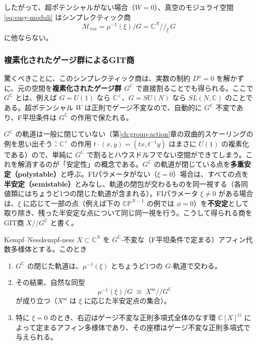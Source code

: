 \documentclass[uplatex, dvipdfmx, book]{jsbook}
\let\origsubsubsection\subsubsection
\renewcommand{\subsection}{\origsubsubsection}
\renewcommand{\subsubsection}{\paragraph}
\begin{document}
したがって、超ポテンシャルがない場合（$W = 0$）、真空のモジュライ空間 \eqref{eq:susy-moduli} はシンプレクティック商
\begin{equation}
    \mathcal{M}_{\text{vac}} = \mu^{-1}(\xi) / G = \mathbb{C}^N /\!/_{\xi}\, G
\end{equation}
に他ならない。

\subsection{複素化されたゲージ群によるGIT商}

驚くべきことに、このシンプレクティック商は、実数の制約 $D^a = 0$ を解かずに、元の空間を\textbf{複素化されたゲージ群 $G^\mathbb{C}$} で直接割ることでも得られる。ここで $G^\mathbb{C}$ とは、例えば $G = U(1)$ なら $\mathbb{C}^\times$、$G = SU(N)$ なら $SL(N, \mathbb{C})$ のことである。超ポテンシャル $W$ は正則でゲージ不変なので、自動的に $G^\mathbb{C}$ 不変であり、F平坦条件は $G^\mathbb{C}$ の作用で保たれる。

$G^\mathbb{C}$ の軌道は一般に閉じていない（第\ref{ch:group-action}章の双曲的スケーリングの例を思い出そう：$\mathbb{C}^\times$ の作用 $t\cdot(x, y) = (tx, t^{-1}y)$ はまさに $U(1)$ の複素化である）ので、単純に $G^\mathbb{C}$ で割るとハウスドルフでない空間ができてしまう。これを解消するのが「安定性」の概念である。$G^\mathbb{C}$ の軌道が閉じている点を\textbf{多重安定（polystable）}と呼ぶ。FIパラメータがない（$\xi = 0$）場合は、すべての点を\textbf{半安定（semistable）}とみなし、軌道の閉包が交わるものを同一視する（各同値類にはちょうど1つの閉じた軌道が含まれる）。FIパラメータ $\xi \neq 0$ がある場合は、$\xi$ に応じて一部の点（例えば下の $\mathbb{CP}^{N-1}$ の例では $\phi = 0$）を\textbf{不安定}として取り除き、残った半安定な点について同じ同一視を行う。こうして得られる商をGIT商 $X /\!/ G^\mathbb{C}$ と書く。

\begin{mythm}{Kempf--Ness}{kempf-ness}
$X \subset \mathbb{C}^N$ を $G^\mathbb{C}$-不変な（F平坦条件で定まる）アフィン代数多様体とする。このとき
\begin{enumerate}
    \item $G^\mathbb{C}$ の閉じた軌道は、$\mu^{-1}(\xi)$ とちょうど1つの $G$-軌道で交わる。
    \item その結果、自然な同型
    \begin{equation*}
        \mu^{-1}(\xi) / G \;\cong\; X^{\text{ss}} /\!/ G^\mathbb{C}
    \end{equation*}
    が成り立つ（$X^{\text{ss}}$ は $\xi$ に応じた半安定点の集合）。
    \item 特に $\xi = 0$ のとき、右辺はゲージ不変な正則多項式全体のなす環 $\mathbb{C}[X]^{G}$ によって定まるアフィン多様体であり、その座標はゲージ不変な正則多項式で与えられる。
\end{enumerate}
\end{mythm}
\end{document}
